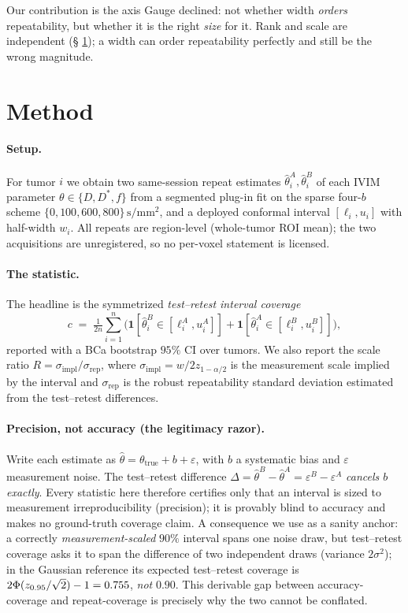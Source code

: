 \documentclass[11pt]{article}
\newcommand{\Dstar}{D^{*}}
\newcommand{\sigimp}{\sigma_{\mathrm{impl}}}
\newcommand{\sigrep}{\sigma_{\mathrm{rep}}}
\begin{document}
Our contribution is the axis Gauge declined: not whether width \emph{orders} repeatability,
but whether it is the right \emph{size} for it. Rank and scale are independent (\S
\ref{sec:method}); a width can order repeatability perfectly and still be the wrong
magnitude.

\section{Method}\label{sec:method}
\paragraph{Setup.} For tumor $i$ we obtain two same-session repeat estimates
$\hat\theta^{A}_i,\hat\theta^{B}_i$ of each IVIM parameter $\theta\in\{D,\Dstar,f\}$ from a
segmented plug-in fit on the sparse four-$b$ scheme $\{0,100,600,800\}\,\mathrm{s/mm^2}$,
and a deployed conformal interval $[\ell_i,u_i]$ with half-width $w_i$. All repeats are
region-level (whole-tumor ROI mean); the two acquisitions are unregistered, so no per-voxel
statement is licensed.

\paragraph{The statistic.} The headline is the symmetrized \emph{test--retest interval
coverage}
\[
c \;=\; \tfrac{1}{2n}\sum_{i=1}^{n}\Big(\mathbf{1}[\hat\theta^{B}_i\in[\ell^{A}_i,u^{A}_i]]
   + \mathbf{1}[\hat\theta^{A}_i\in[\ell^{B}_i,u^{B}_i]]\Big),
\]
reported with a BCa bootstrap $95\%$ CI over tumors. We also report the scale ratio
$R=\sigimp/\sigrep$, where $\sigimp=w/2z_{1-\alpha/2}$ is the measurement scale implied by
the interval and $\sigrep$ is the robust repeatability standard deviation estimated from the
test--retest differences.

\paragraph{Precision, not accuracy (the legitimacy razor).} Write each estimate as
$\hat\theta = \theta_{\mathrm{true}} + b + \varepsilon$, with $b$ a systematic bias and
$\varepsilon$ measurement noise. The test--retest difference
$\Delta = \hat\theta^{B}-\hat\theta^{A} = \varepsilon^{B}-\varepsilon^{A}$ \emph{cancels
$b$ exactly}. Every statistic here therefore certifies only that an interval is sized to
measurement irreproducibility (precision); it is provably blind to accuracy and makes no
ground-truth coverage claim. A consequence we use as a sanity anchor: a correctly
\emph{measurement-scaled} $90\%$ interval spans one noise draw, but test--retest coverage
asks it to span the difference of two independent draws (variance $2\sigma^2$); in the
Gaussian reference its expected test--retest coverage is
$2\Phi(z_{0.95}/\sqrt2)-1 = 0.755$, \emph{not} $0.90$. This derivable gap between
accuracy-coverage and repeat-coverage is precisely why the two cannot be conflated.
\end{document}
